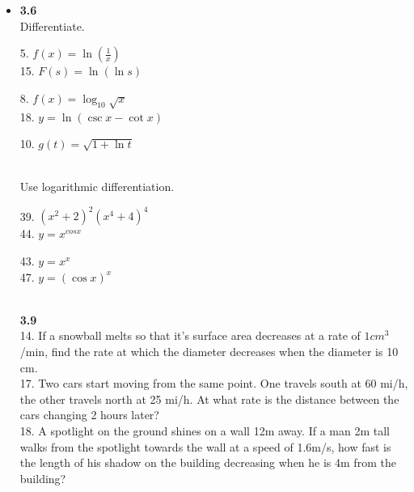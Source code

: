\documentclass{letter}
\begin{document}
	\begin{itemize}
		\item[] \textbf{3.6}\\
		
		Differentiate.\\
		\begin{minipage}[t]{0.3\textwidth}
			5. $f(x) = \ln(\frac{1}{x})$\\
			15. $F(s) = \ln(\ln s)$
		\end{minipage}
		\begin{minipage}[t]{0.3\textwidth}
			8. $f(x) = \log_{10} \sqrt x$\\
			18. $y = \ln(\csc x - \cot x)$\\
		\end{minipage}
		\begin{minipage}[t]{0.3\textwidth}
			10. $g(t) = \sqrt{1+ \ln t}$
		\end{minipage}\\
		
		Use logarithmic differentiation.\\
		\begin{minipage}[t]{0.5\textwidth}
			39. $(x^2 + 2)^2 (x^4+4)^4$\\
			44. $y = x^{cos x}$
		\end{minipage}
		\begin{minipage}[t]{0.5\textwidth}
			43. $y = x^x$\\
			47. $y = (\cos x)^x$\\
		\end{minipage}\\
		
		\textbf{3.9}\\
		
		14. If a snowball melts so that it's surface area decreases at a rate of $1cm^3$/min, find the rate at which the diameter decreases when the diameter is 10 cm.\\
		
		17. Two cars start moving from the same point. One travels south at 60 mi/h, the other travels north at 25 mi/h. At what rate is the distance between the cars changing 2 hours later?\\
		
		18. A spotlight on the ground shines on a wall 12m away. If a man 2m tall walks from the spotlight towards the wall at a speed of 1.6m/s, how fast is the length of his shadow on the building decreasing when he is 4m from the building?\\
		

\end{itemize}
\end{document}
